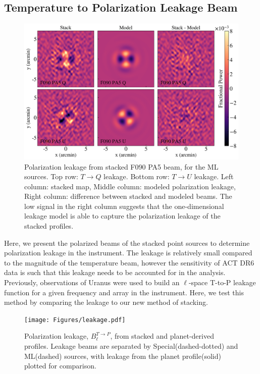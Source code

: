 \subsection{Temperature to Polarization Leakage Beam}
\label{subsec:polbeam}
\begin{figure}[t]
    \centering
    \includegraphics[width = \textwidth]{Figures/polbeams.png}
    \caption{Polarization leakage from stacked F090 PA5 beam, for the ML sources.  Top row: $T\rightarrow Q$ leakage.  Bottom row: $T\rightarrow U$ leakage. 
    Left column: stacked map, Middle column: modeled polarization leakage, Right column: difference between stacked and modeled beams.  The low signal in the right column suggests that the one-dimensional leakage model is able to capture the polarization leakage of the stacked profiles.}
    \label{fig:polmodel}
\end{figure}
Here, we present the polarized beams of the stacked point sources to determine polarization leakage in the instrument.  The leakage is relatively small compared to the magnitude of the temperature beam, however the sensitivity of ACT DR6 data is such that this leakage needs to be accounted for in the analysis.  Previously, observations of Uranus were used to build an $\ell$-space T-to-P leakage function for a given frequency and array in the instrument.  Here, we test this method by comparing the leakage to our new method of stacking.

\begin{figure}[t]
    \centering
    \texttt{[image: Figures/leakage.pdf]}
    \caption{Polarization leakage, $B^{T\rightarrow P}_{\ell}$, from stacked and planet-derived profiles.  Leakage beams are separated by Special(dashed-dotted) and ML(dashed) sources, with leakage from the planet profile(solid) plotted for comparison.}
    \label{fig:leakage}
\end{figure}

